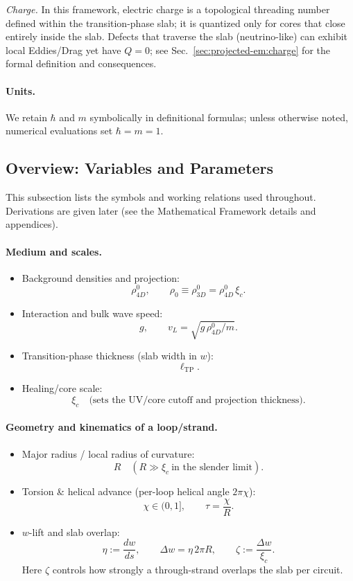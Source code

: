 \emph{Charge.} In this framework, electric charge is a topological threading number defined within the transition-phase slab; it is quantized only for cores that close entirely inside the slab. Defects that traverse the slab (neutrino-like) can exhibit local Eddies/Drag yet have $Q=0$; see Sec.~\ref{sec:projected-em:charge} for the formal definition and consequences.

\paragraph{Units.}
We retain $\hbar$ and $m$ symbolically in definitional formulas; unless otherwise noted, numerical evaluations set $\hbar=m=1$.

\medskip

\subsection{Overview: Variables and Parameters}

This subsection lists the symbols and working relations used throughout. Derivations are given later (see the Mathematical Framework details and appendices).

\paragraph{Medium and scales.}
\begin{itemize}
  \item Background densities and projection:
  \[
  \rho_{4D}^0,\qquad \rho_0\equiv \rho_{3D}^0=\rho_{4D}^0\,\xi_c.
  \]
  \item Interaction and bulk wave speed:
  \[
  g,\qquad v_L=\sqrt{g\,\rho_{4D}^0/m}.
  \]
  \item Transition-phase thickness (slab width in $w$):
  \[
  \ell_{\mathrm{TP}}.
  \]
  \item Healing/core scale:
  \[
  \xi_c \quad \text{(sets the UV/core cutoff and projection thickness)}.
  \]
\end{itemize}

\paragraph{Geometry and kinematics of a loop/strand.}
\begin{itemize}
  \item Major radius / local radius of curvature:
  \[
  R\quad (R\gg \xi_c\ \text{in the slender limit}).
  \]
  \item Torsion \& helical advance (per-loop helical angle $2\pi\chi$):
  \[
  \chi\in(0,1],\qquad \tau=\frac{\chi}{R}.
  \]
  \item $w$-lift and slab overlap:
  \[
  \eta:=\frac{dw}{ds},\qquad \Delta w= \eta\,2\pi R,\qquad
  \zeta:=\frac{\Delta w}{\xi_c}.
  \]
  Here $\zeta$ controls how strongly a through-strand overlaps the slab per circuit.
\end{itemize}

